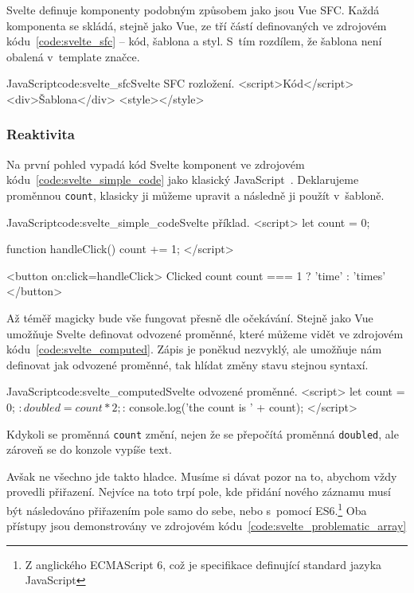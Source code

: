 \documentclass[
  master,
  program=ainf,
  printversion,
  tables=false,
  sourcecodes,
  glossaries,
  index
]{kidiplom}
\begin{document}
Svelte definuje komponenty podobným způsobem jako jsou Vue SFC. Každá komponenta se skládá,
stejně jako Vue, ze tří částí definovaných ve zdrojovém kódu~\ref{code:svelte_sfc} -- kód, šablona a styl.
S~tím rozdílem, že šablona není obalená v~template značce.

\begin{absolutelynopagebreak}
\begin{kicode}{JavaScript}{code:svelte_sfc}{Svelte SFC rozložení.}
  <script>Kód</script>
  <div>Šablona</div>
  <style></style>
\end{kicode}
\end{absolutelynopagebreak}

\subsubsection{Reaktivita}

Na první pohled vypadá kód Svelte komponent ve zdrojovém kódu~\ref{code:svelte_simple_code} jako klasický JavaScript~\cite{js}. Deklarujeme proměnnou {\tt count},
klasicky ji můžeme upravit a následně ji použít v~šabloně.

\begin{kicode}{JavaScript}{code:svelte_simple_code}{Svelte příklad.}
  <script>
    let count = 0;

    function handleClick() {
      count += 1;
    }
  </script>

  <button on:click={handleClick}>
    Clicked {count} {count === 1 ? 'time' : 'times'}
  </button>
\end{kicode}

Až téměř magicky bude vše fungovat přesně dle očekávání. Stejně jako Vue umožňuje Svelte definovat
odvozené proměnné, které můžeme vidět ve zdrojovém kódu~\ref{code:svelte_computed}. Zápis je poněkud nezvyklý, ale umožňuje nám definovat jak odvozené proměnné, tak
hlídat změny stavu stejnou syntaxí. 

  \begin{kicode}{JavaScript}{code:svelte_computed}{Svelte odvozené proměnné.}
    <script>
      let count = 0;
      $: doubled = count * 2;

      $: {
        console.log('the count is ' + count);
      }
    </script>
  \end{kicode}

Kdykoli se proměnná {\tt count} změní, nejen že se přepočítá proměnná {\tt doubled}, ale zároveň se do konzole
vypíše text.

Avšak ne všechno jde takto hladce. Musíme si dávat pozor na to, abychom vždy provedli přiřazení.
Nejvíce na toto trpí pole, kde přidání nového záznamu musí být následováno přiřazením pole
samo do sebe, nebo s~pomocí ES6.\footnote{Z anglického ECMAScript 6, což je specifikace definující standard jazyka JavaScript} Oba přístupy jsou demonstrovány ve zdrojovém kódu~\ref{code:svelte_problematic_array}
\end{document}
